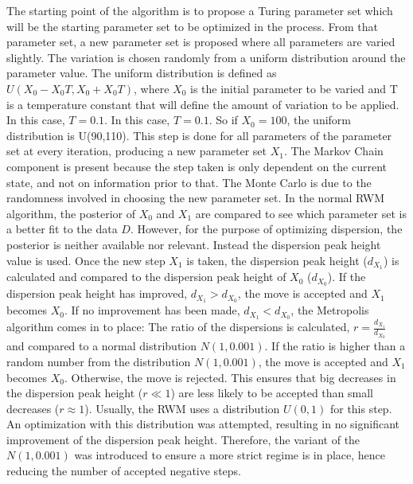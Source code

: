 The starting point of the algorithm is to propose a Turing parameter set which will be the starting parameter set to be optimized in the process.
From that parameter set, a new parameter set is proposed where all parameters are varied slightly.
The variation is chosen randomly from a uniform distribution around the parameter value.
The uniform distribution is defined as $U(X_{0} - X_{0}T, X_{0} + X_{0}T)$, where $X_{0}$ is the initial parameter to be varied and T is a temperature constant that will define the amount of variation to be applied.
In this case, $T=0.1$.
In this case, $T=0.1$.
So if $X_{0}=100$, the uniform distribution is U(90,110).
This step is done for all parameters of the parameter set at every iteration, producing a new parameter set $X_{1}$.
The Markov Chain component is present because the step taken is only dependent on the current state, and not on information prior to that.
The Monte Carlo is due to the randomness involved in choosing the new parameter set.
In the normal RWM algorithm, the posterior of $X_{0}$ and $X_{1}$ are compared to see which parameter set is a better fit to the data $D$.
However, for the purpose of optimizing dispersion, the posterior is neither available nor relevant.
Instead the dispersion peak height value is used.
Once the new step $X_{1}$ is taken, the dispersion peak height ($d_{X_{1}}$) is calculated and compared to the dispersion peak height of $X_{0}$ ($d_{X_{0}}$). If the dispersion peak height has improved, $d_{X_{1}} > d_{X_{0}}$, the move is accepted and $X_{1}$ becomes $X_{0}$.
If no improvement has been made, $d_{X_{1}} < d_{X_{0}}$, the Metropolis algorithm comes in to place: The ratio of the dispersions is calculated, $r = \frac{d_{X_{1}}}{d_{X_{0}}}$ and compared to a normal distribution $N(1,0.001)$.
If the ratio is higher than a random number from the distribution $N(1,0.001)$, the move is accepted and $X_{1}$ becomes $X_{0}$.
Otherwise, the move is rejected.
This ensures that big decreases in the dispersion peak height ($r \ll 1$) are less likely to be accepted than small decreases ($r \approx 1$).
Usually, the RWM uses a distribution $U(0,1)$ for this step.
An optimization with this distribution was attempted, resulting in no significant improvement of the dispersion peak height.
Therefore, the variant of the $N(1,0.001) $ was introduced to ensure a more strict regime is in place, hence reducing the number of accepted negative steps.


